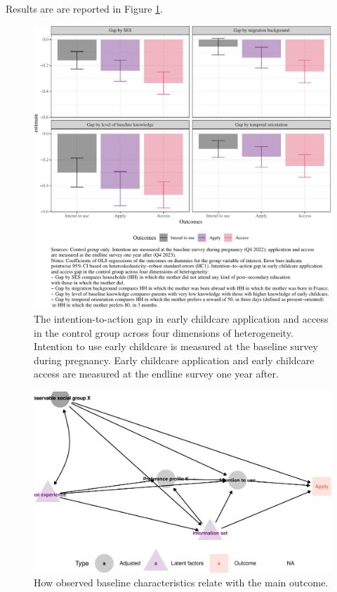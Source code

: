 \documentclass[
]{article}
\theoremstyle{definition}
\theoremstyle{definition}
\theoremstyle{definition}
\theoremstyle{definition}
\theoremstyle{remark}
\begin{document}
Results are are reported in Figure \ref{fig:AttentionAction}.

\begin{figure}[H]
\includegraphics[width=1\linewidth]{Theory_files/figure-latex/AttentionAction-1} \caption{ The intention-to-action gap in early childcare application and access in the control group across four dimensions of heterogeneity. Intention to use early childcare is measured at the baseline survey during pregnancy. Early childcare application and early childcare access are measured at the endline survey one year after.}\label{fig:AttentionAction}
\end{figure}

\begin{figure}
\centering
\includegraphics{Theory_files/figure-latex/DagIntention-1.pdf}
\caption{\label{fig:DagIntention}How observed baseline characteristics relate with the main outcome.}
\end{figure}
\end{document}
